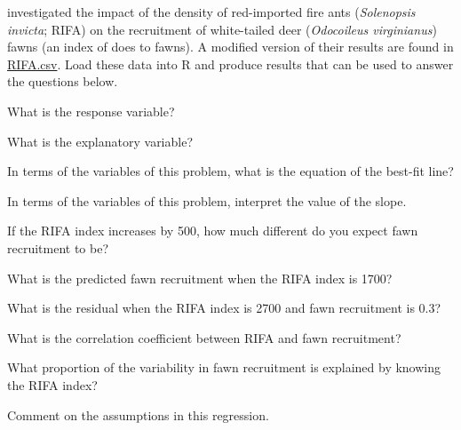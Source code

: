 \documentclass[10pt,openany]{book}\usepackage[]{graphicx}\usepackage[]{color}
\begin{document}
\begin{exsection}
  \item \label{revex:RegRIFA} \rhw{} \cite{Allenetal1997} investigated the impact of the density of red-imported fire ants (\emph{Solenopsis invicta}; RIFA) on the recruitment of white-tailed deer (\emph{Odocoileus virginianus}) fawns (an index of does to fawns).  A modified version of their results are found in \href{https://raw.githubusercontent.com/droglenc/NCData/master/RIFA.csv}{RIFA.csv}.  Load these data into R and produce results that can be used to answer the questions below. 
    \begin{Enumerate}
      \item What is the response variable?
      \item What is the explanatory variable?
      \item In terms of the variables of this problem, what is the equation of the best-fit line?
      \item In terms of the variables of this problem, interpret the value of the slope.
      \item If the RIFA index increases by 500, how much different do you expect fawn recruitment to be?
      \item What is the predicted fawn recruitment when the RIFA index is 1700?
      \item What is the residual when the RIFA index is 2700 and fawn recruitment is 0.3?
      \item What is the correlation coefficient between RIFA and fawn recruitment?
      \item What proportion of the variability in fawn recruitment is explained by knowing the RIFA index?
      \item Comment on the assumptions in this regression.
    \end{Enumerate}


\end{exsection}
\end{document}
